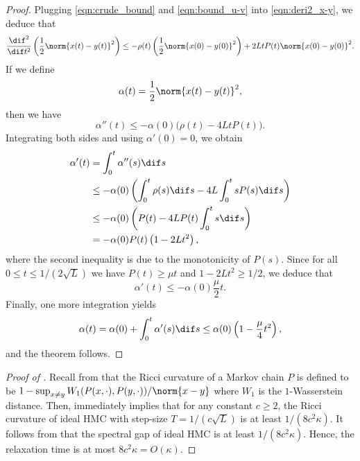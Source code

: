\begin{proof}
	Plugging \eqref{eqn:crude_bound} and \eqref{eqn:bound_u-v} into \eqref{eqn:deri2_x-y}, we deduce that
	\begin{equation*}
		\frac{\dif^2}{\dif t^2} \left( \frac{1}{2} \norm{x(t)-y(t)}^2 \right) 
		\le - \rho(t) \left( \frac{1}{2} \norm{x(0) - y(0)}^2 \right) + 2Lt P(t) \norm{x(0)-y(0)}^2. 
	\end{equation*}
	If we define
	\[
	\alpha(t) = \frac{1}{2} \norm{x(t)-y(t)}^2, 
	\]
	then we have 
	\[
	\alpha''(t) \le - \alpha(0) \big( \rho(t)  - 4L t P(t) \big).
	\]
	Integrating both sides and using $\alpha'(0) = 0$, we obtain
	\begin{align*}
		\alpha'(t) &= \int_{0}^t \alpha''(s) \dif s\\ 
		&\le - \alpha(0) \left( \int_{0}^t \rho(s) \dif s - 4L \int_{0}^t sP(s) \dif s \right)\\ 
		&\le - \alpha(0) \left( P(t) - 4L P(t) \int_{0}^t s \dif s \right)\\ 
		&= - \alpha(0) P(t) \left( 1 - 2Lt^2 \right), 
	\end{align*}
	where the second inequality is due to the monotonicity of $P(s)$. 
	Since for all $0\le t\le 1/(2\sqrt{L})$ we have $P(t) \ge \mu t$ and $1-2Lt^2 \ge 1/2$, we deduce that
	\[
	\alpha'(t) \le - \alpha(0) \frac{\mu}{2} t.
	\]
	Finally, one more integration yields
	\[
	\alpha(t) = \alpha(0) + \int_{0}^t \alpha'(s) \dif s \le \alpha(0) \left( 1 - \frac{\mu}{4} t^2 \right), 
	\]
	and the theorem follows.
\end{proof}

\begin{proof}[Proof of ]
	Recall from  that the Ricci curvature of a Markov chain $P$ is defined to be 
	$1 - \sup_{x\neq y} W_1(P(x, \cdot), P(y, \cdot)) / \norm{x-y}$ where $W_1$ is the $1$-Wasserstein distance. 
	Then,  immediately implies that for any constant $c\ge 2$, the Ricci curvature of ideal HMC with step-size $T=1/(c\sqrt{L})$ is at least $1/(8c^2\kappa)$. 
	It follows from \cite[Proposition 29]{O09} that the spectral gap of ideal HMC is at least $1/(8c^2\kappa)$. Hence, the relaxation time is
%
at most   %
$8c^2\kappa = O(\kappa)$.
\end{proof}


